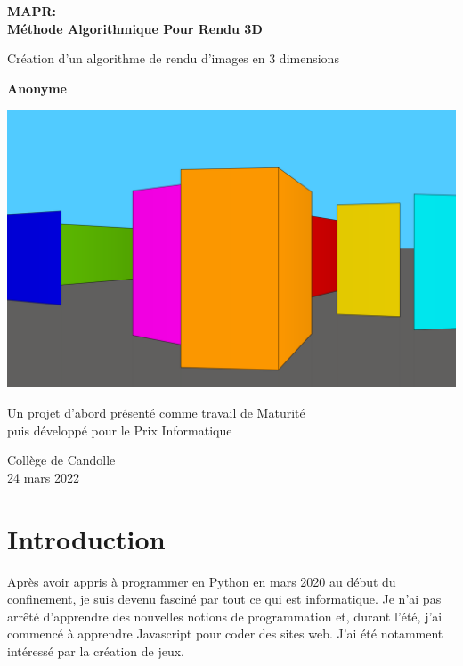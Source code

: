 \documentclass[11pt,french,a4paper,]{article}
\date{}
\def\myauthor{Anonyme}
\begin{document}
\begin{titlepage}
	\begin{center}
		\vspace*{1cm}

		\Huge
		\textbf{MAPR: \\ Méthode Algorithmique Pour Rendu 3D}

		\vspace{0.5cm}
		\LARGE
		Création d’un algorithme de rendu d’images en 3 dimensions 

		\vspace{1.5cm}

		\textbf{\myauthor}

		\includegraphics{../img/CoverPic/Main_Pic4.png}

		\vfill
		Un projet d'abord présenté comme travail de Maturité \\
		puis développé pour le Prix Informatique
				
		\vspace{0.8cm}
		
		\Large
		Collège de Candolle \\
		24 mars 2022
	\end{center}
\end{titlepage}



\thispagestyle{empty}

{
\hypersetup{linkcolor=}
\setcounter{tocdepth}{3}
\tableofcontents
}
\hypertarget{introduction}{%
\section{Introduction}\label{introduction}}

Après avoir appris à programmer en Python en mars 2020 au début du
confinement, je suis devenu fasciné par tout ce qui est informatique. Je
n'ai pas arrêté d'apprendre des nouvelles notions de programmation et,
durant l'été, j'ai commencé à apprendre Javascript pour coder des sites
web. J'ai été notamment intéressé par la création de jeux.
\end{document}
